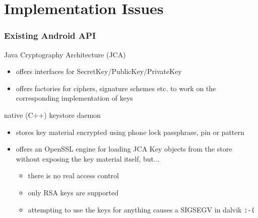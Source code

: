 \documentclass{beamer}
\begin{document}
\section{Implementation Issues}
	\begin{frame}
		\tableofcontents[currentsection]
	\end{frame}
	\begin{frame}
		\frametitle{Existing Android API}

		\begin{block}{Java Cryptography Architecture (JCA)}
		\begin{itemize}
			\item offers interfaces for SecretKey/PublicKey/PrivateKey
			\item offers factories for ciphers, signature schemes etc. to work on the corresponding implementation of keys
		\end{itemize}
		\end{block}

		\begin{block}{native (C++) keystore daemon}
		\begin{itemize}
			\item stores key material encrypted using phone lock passphrase, pin or pattern
			\item offers an OpenSSL engine for loading JCA Key objects from the store without exposing the key material itself, but...
				\begin{itemize}
					\item there is no real access control
					\item only RSA keys are supported
					\item attempting to use the keys for anything causes a SIGSEGV in dalvik {\tt :-(}
				\end{itemize}
		\end{itemize}
		\end{block}
	\end{frame}
\end{document}
